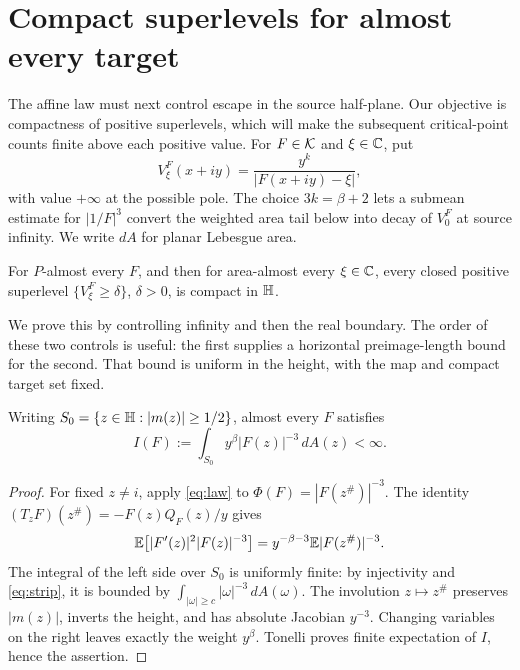 \section{Compact superlevels for almost every target}\label{sec:escape}

The affine law must next control escape in the source half-plane.
Our objective is compactness of positive superlevels, which will make
the subsequent critical-point counts finite above each positive value.
For \(F\in\mathcal K\) and \(\xi\in\mathbb C\), put
\[
 V_\xi^F(x+iy)=\frac{y^k}{|F(x+iy)-\xi|},
\]
with value \(+\infty\) at the possible pole.
The choice \(3k=\beta+2\) lets a submean estimate for \(|1/F|^3\)
convert the weighted area tail below into decay of \(V_0^F\) at
source infinity.
We write \(dA\) for planar Lebesgue area.

\begin{proposition}\label{prop:compact-levels}
For \(P\)-almost every \(F\), and then for area-almost every
\(\xi\in\mathbb C\), every closed positive superlevel
\(\{V_\xi^F\ge\delta\}\), \(\delta>0\), is compact in \(\mathbb H\).
\end{proposition}

We prove this by controlling infinity and then the real boundary.
The order of these two controls is useful: the first supplies
a horizontal preimage-length bound for the second. That bound is
uniform in the height, with the map and compact target set fixed.

\begin{lemma}\label{lem:area-tail}
Writing \(S_0=\{z\in\mathbb H:|m(z)|\ge1/2\}\), almost every \(F\) satisfies
\begin{equation}\label{eq:area-tail}
 I(F):=\int_{S_0}y^\beta|F(z)|^{-3}\,dA(z)<\infty.
\end{equation}
\end{lemma}
\begin{proof}
For fixed \(z\ne i\), apply \eqref{eq:law} to
\(\Phi(F)=|F(z^\#)|^{-3}\).
The identity
\((T_zF)(z^\#)=-F(z)Q_F(z)/y\) gives
\[
 \mathbb E\bigl[|F'(z)|^2|F(z)|^{-3}\bigr]
 =y^{-\beta-3}\mathbb E|F(z^\#)|^{-3}.
\]
The integral of the left side over \(S_0\) is uniformly finite:
by injectivity and \eqref{eq:strip}, it is bounded by
\(\int_{|\omega|\ge c}|\omega|^{-3}\,dA(\omega)\).
The involution \(z\mapsto z^\#\) preserves \(|m(z)|\), inverts
the height, and has absolute Jacobian \(y^{-3}\).
Changing variables on the right leaves exactly the weight \(y^\beta\).
Tonelli proves finite expectation of \(I\), hence the assertion.
\end{proof}


